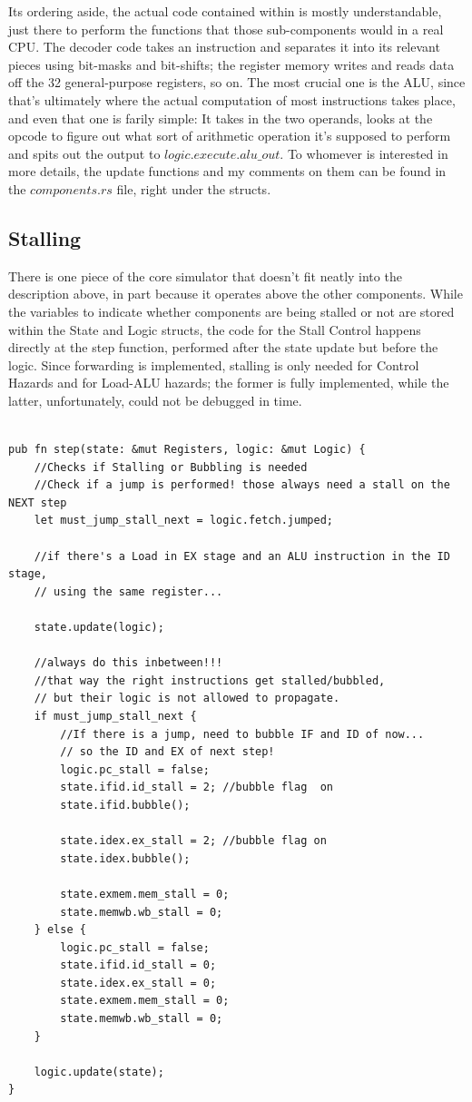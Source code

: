 \documentclass[12pt,twoside]{reedthesis}
\begin{document}
Its ordering aside, the actual code contained within is mostly understandable, just there to perform the functions that those sub-components would in a real CPU. The decoder code takes an instruction and separates it into its relevant pieces using bit-masks and bit-shifts; the register memory writes and reads data off the 32 general-purpose registers, so on. The most crucial one is the ALU, since that's ultimately where the actual computation of most instructions takes place, and even that one is farily simple: It takes in the two operands, looks at the opcode to figure out what sort of arithmetic operation it's supposed to perform and spits out the output to $logic.execute.alu\_out$. To whomever is interested in more details, the update functions and my comments on them can be found in the $components.rs$ file, right under the structs.

\subsection{Stalling}

There is one piece of the core simulator that doesn't fit neatly into the description above, in part because it operates above the other components. While the variables to indicate whether components are being stalled or not are stored within the State and Logic structs, the code for the Stall Control happens directly at the step function, performed after the state update but before the logic. Since forwarding is implemented, stalling is only needed for Control Hazards and for Load-ALU hazards; the former is fully implemented, while the latter, unfortunately, could not be debugged in time.

\begin{lstlisting}

pub fn step(state: &mut Registers, logic: &mut Logic) {
    //Checks if Stalling or Bubbling is needed
    //Check if a jump is performed! those always need a stall on the NEXT step
    let must_jump_stall_next = logic.fetch.jumped;

    //if there's a Load in EX stage and an ALU instruction in the ID stage,
	// using the same register...

    state.update(logic);

    //always do this inbetween!!!
	//that way the right instructions get stalled/bubbled,
	// but their logic is not allowed to propagate.
    if must_jump_stall_next {
        //If there is a jump, need to bubble IF and ID of now...
		// so the ID and EX of next step!
        logic.pc_stall = false;
        state.ifid.id_stall = 2; //bubble flag  on
        state.ifid.bubble();

        state.idex.ex_stall = 2; //bubble flag on
        state.idex.bubble();

        state.exmem.mem_stall = 0;
        state.memwb.wb_stall = 0;
    } else {
        logic.pc_stall = false;
        state.ifid.id_stall = 0;
        state.idex.ex_stall = 0;
        state.exmem.mem_stall = 0;
        state.memwb.wb_stall = 0;
    }

    logic.update(state);
}
\end{lstlisting}
\end{document}
